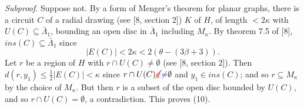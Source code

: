 \textit{Subproof.} Suppose not. By a form of Menger's theorem for planar graphs, there is a circuit $C$ of a radial drawing (see [8, section 2]) $K$ of $H$, of length $< 2\kappa$ with $U(C) \subseteq \bar{\Lambda}_1$, bounding an open disc in $\bar{\Lambda}_1$ including $M_\kappa$. By theorem 7.5 of [8], $ins(C) \subseteq \bar{\Lambda}_1$ since
\begin{equation*}
|E(C)| < 2\kappa < 2(\theta - (3\beta + 3)).
\end{equation*}
Let $r$ be a region of $H$ with $r \cap U(C) \ne \emptyset$ (see [8, section 2]). Then $d(r, y_1) \le \frac{1}{2}|E(C)| < \kappa$ since $r \cap U(C) \delm{\notin}\fix{\ne} \emptyset$ and $y_1 \in ins(C)$; and so $r \subseteq M_\kappa$ by the choice of $M_\kappa$. But then $r$ is a subset of the open disc bounded by $U(C)$, and so $r \cap U(C) = \emptyset$, a contradiction. This proves (10).
